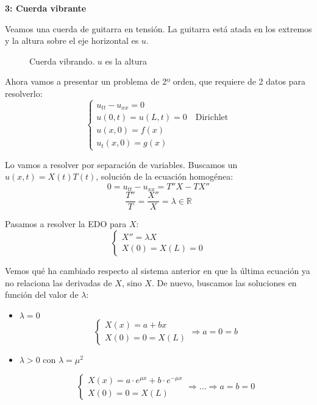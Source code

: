 		\clearpage
		\begin{example}{\bf 3: Cuerda vibrante}

			Veamos una cuerda de guitarra en tensión. La guitarra está atada en los extremos y la altura sobre el eje horizontal es $u$.

			\begin{figure}[thbp]
			\centering
			\caption{Cuerda vibrando. $u$ es la altura}
			\label{fig:cuerdaGuitarra}
			\end{figure}

			Ahora vamos a presentar un problema de 2º orden, que requiere de 2 datos para resolverlo:
			\[  \begin{cases}
				u_{tt} - u_{xx} = 0\\
				u(0,t) = u(L,t) = 0 \quad \text{Dirichlet}\\
				u(x,0) = f(x) \\
				u_t(x,0) = g(x)
				\end{cases}
			\]

			Lo vamos a resolver por separación de variables. Buscamos un $u(x,t) = X(t) T(t)$, solución de la ecuación homogénea:
			\[ 0 = u_{tt} - u_{xx} = T'' X - T X''\]
			\[ \frac{T''}{T} = \frac{X''}{X} = \lambda \in \mathbb{R}\]

			Pasamos a resolver la EDO para $X$:
			\[\begin{cases}
				X'' = \lambda X \\
				X(0) = X(L) = 0
			\end{cases}
			\]

			Vemos qué ha cambiado respecto al sistema anterior en que la última ecuación ya no relaciona las derivadas de $X$, sino $X$. De nuevo, buscamos las soluciones en función del valor de $\lambda$:

			\begin{itemize}
				\item $\lambda = 0$
					\[
					\left\{
					\begin{array}{l}
					X(x) = a + bx \\
					X(0) = 0 = X(L)
					\end{array}
					\right.
					\Rightarrow
					a = 0 = b
					\]

				\item $\lambda > 0$ con $\lambda = \mu^2$

					\[
					\left\{
					\begin{array}{l}
					X(x) = a \cdot e^{\mu x} + b \cdot e^{-\mu x} \\
					X(0) = 0 = X(L)
					\end{array}
					\right.
					\Rightarrow … \Rightarrow
					a = b = 0
					\]


\end{itemize}
\end{example}

